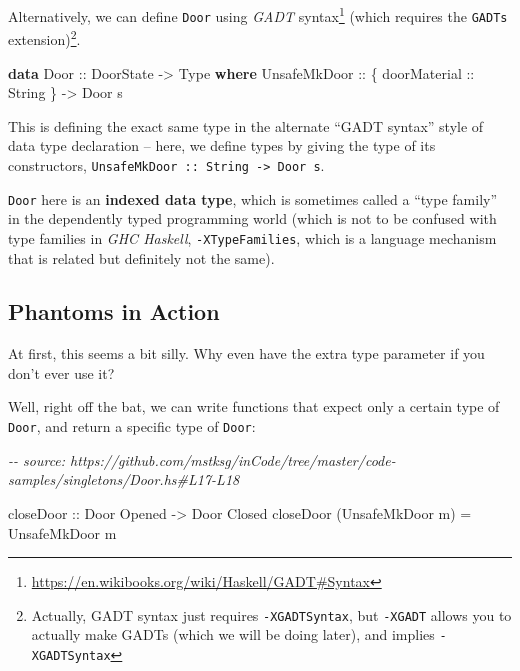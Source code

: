 \documentclass[]{article}
\newenvironment{Shaded}{}{}
\newcommand{\CommentTok}[1]{\textcolor[rgb]{0.38,0.63,0.69}{\textit{#1}}}
\newcommand{\DataTypeTok}[1]{\textcolor[rgb]{0.56,0.13,0.00}{#1}}
\newcommand{\KeywordTok}[1]{\textcolor[rgb]{0.00,0.44,0.13}{\textbf{#1}}}
\newcommand{\NormalTok}[1]{#1}
\newcommand{\OtherTok}[1]{\textcolor[rgb]{0.00,0.44,0.13}{#1}}
\renewcommand{\href}[2]{#2\footnote{\url{#1}}}
\begin{document}
Alternatively, we can define \texttt{Door} using
\href{https://en.wikibooks.org/wiki/Haskell/GADT\#Syntax}{\emph{GADT} syntax}
(which requires the \texttt{GADTs} extension)\footnote{Actually, GADT syntax
  just requires \texttt{-XGADTSyntax}, but \texttt{-XGADT} allows you to
  actually make GADTs (which we will be doing later), and implies
  \texttt{-XGADTSyntax}}.

\begin{Shaded}
\begin{Highlighting}[]
\KeywordTok{data} \DataTypeTok{Door}\OtherTok{ ::} \DataTypeTok{DoorState} \OtherTok{{-}\textgreater{}} \DataTypeTok{Type} \KeywordTok{where}
    \DataTypeTok{UnsafeMkDoor}\OtherTok{ ::}\NormalTok{ \{}\OtherTok{ doorMaterial ::} \DataTypeTok{String}\NormalTok{ \} }\OtherTok{{-}\textgreater{}} \DataTypeTok{Door}\NormalTok{ s}
\end{Highlighting}
\end{Shaded}

This is defining the exact same type in the alternate ``GADT syntax'' style of
data type declaration -- here, we define types by giving the type of its
constructors, \texttt{UnsafeMkDoor\ ::\ String\ -\textgreater{}\ Door\ s}.

\texttt{Door} here is an \textbf{indexed data type}, which is sometimes called a
``type family'' in the dependently typed programming world (which is not to be
confused with type families in \emph{GHC Haskell}, \texttt{-XTypeFamilies},
which is a language mechanism that is related but definitely not the same).

\subsection{Phantoms in Action}\label{phantoms-in-action}

At first, this seems a bit silly. Why even have the extra type parameter if you
don't ever use it?

Well, right off the bat, we can write functions that expect only a certain type
of \texttt{Door}, and return a specific type of \texttt{Door}:

\begin{Shaded}
\begin{Highlighting}[]
\CommentTok{{-}{-} source: https://github.com/mstksg/inCode/tree/master/code{-}samples/singletons/Door.hs\#L17{-}L18}

\OtherTok{closeDoor ::} \DataTypeTok{Door} \DataTypeTok{\textquotesingle{}Opened} \OtherTok{{-}\textgreater{}} \DataTypeTok{Door} \DataTypeTok{\textquotesingle{}Closed}
\NormalTok{closeDoor (}\DataTypeTok{UnsafeMkDoor}\NormalTok{ m) }\OtherTok{=} \DataTypeTok{UnsafeMkDoor}\NormalTok{ m}
\end{Highlighting}
\end{Shaded}
\end{document}
